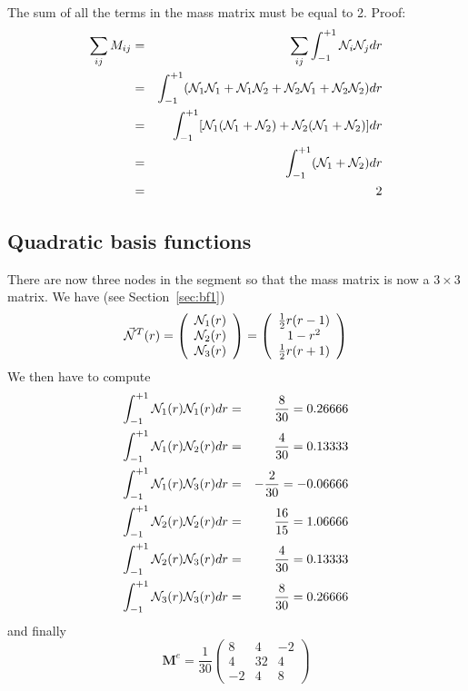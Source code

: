 \begin{remark} 
The sum of all the terms in the mass matrix must be equal to 2. Proof: 
\begin{eqnarray}
\sum_{ij} M_{ij} 
&=&\sum_{ij} \int_{-1}^{+1} {\mathcal{N}}_i {\mathcal{N}}_j dr \nonumber\\
&=&\int_{-1}^{+1} ({\mathcal{N}}_1{\mathcal{N}}_1+{\mathcal{N}}_1{\mathcal{N}}_2+{\mathcal{N}}_2{\mathcal{N}}_1+{\mathcal{N}}_2{\mathcal{N}}_2) dr\nonumber\\
&=&\int_{-1}^{+1} [{\mathcal{N}}_1({\mathcal{N}}_1+{\mathcal{N}}_2)+{\mathcal{N}}_2({\mathcal{N}}_1+{\mathcal{N}}_2)]dr\nonumber\\
&=&\int_{-1}^{+1} ({\mathcal{N}}_1 + {\mathcal{N}}_2) dr\nonumber\\
&=& 2\nonumber
\end{eqnarray}
\end{remark}


\subsection{Quadratic basis functions}
There are now three nodes in the segment so that the mass matrix 
is now a $3\times3$ matrix. We have (see Section~\ref{sec:bf1}) 
\begin{equation}
{\vec {{\mathcal{N}}}}^T(r) = 
\left(
\begin{array}{c}
{\mathcal{N}}_1(r) \\ 
{\mathcal{N}}_2(r) \\ 
{\mathcal{N}}_3(r) 
\end{array}
\right)
=
\left(
\begin{array}{c}
\frac{1}{2} r (r-1) \\
1-r^2 \\
\frac{1}{2} r (r+1) 
\end{array}
\right)
\end{equation}
We then have to compute
\begin{eqnarray}
\int_{-1}^{+1} {\mathcal{N}}_1(r) {\mathcal{N}}_1(r) dr &=& \frac{8}{30}  = 0.26666 \nonumber\\
\int_{-1}^{+1} {\mathcal{N}}_1(r) {\mathcal{N}}_2(r) dr &=& \frac{4}{30}  =0.13333  \nonumber\\
\int_{-1}^{+1} {\mathcal{N}}_1(r) {\mathcal{N}}_3(r) dr &=& -\frac{2}{30} =-0.06666\nonumber\\ 
\int_{-1}^{+1} {\mathcal{N}}_2(r) {\mathcal{N}}_2(r) dr &=& \frac{16}{15} = 1.06666 \nonumber\\
\int_{-1}^{+1} {\mathcal{N}}_2(r) {\mathcal{N}}_3(r) dr &=& \frac{4}{30}  =0.13333 \nonumber\\
\int_{-1}^{+1} {\mathcal{N}}_3(r) {\mathcal{N}}_3(r) dr &=& \frac{8}{30} = 0.26666  \nonumber
\end{eqnarray}
and finally 
\begin{equation}
\boxed{
{\bm M}^e 
=\frac{1}{30}
\left(
\begin{array}{ccc}
8  & 4 & -2 \\
4  & 32 & 4 \\
-2 & 4 & 8
\end{array}
\right)
}
\end{equation}
